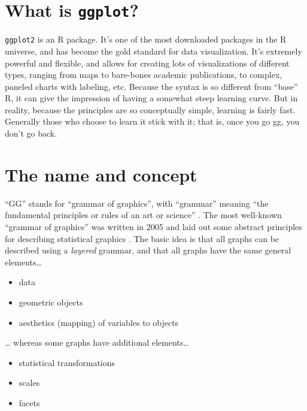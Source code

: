 \documentclass[
]{book}
\providecommand{\tightlist}{%
  \setlength{\itemsep}{0pt}\setlength{\parskip}{0pt}}
\begin{document}
\hypertarget{what-is-ggplot}{%
\section*{\texorpdfstring{What is \texttt{ggplot}?}{What is ggplot?}}\label{what-is-ggplot}}

\texttt{ggplot2} is an R package. It's one of the most downloaded packages in the R universe, and has become the gold standard for data visualization. It's extremely powerful and flexible, and allows for creating lots of visualizations of different types, ranging from maps to bare-bones academic publications, to complex, paneled charts with labeling, etc. Because the syntax is so different from ``base'' R, it can give the impression of having a somewhat steep learning curve. But in reality, because the principles are so conceptually simple, learning is fairly fast. Generally those who choose to learn it stick with it; that is, once you go gg, you don't go back.

\hypertarget{the-name-and-concept}{%
\section*{The name and concept}\label{the-name-and-concept}}

``GG'' stands for ``grammar of graphics'', with ``grammar'' meaning ``the fundamental principles or rules of an art or science'' \citep{layered-grammar}. The most well-known ``grammar of graphics'' was written in 2005 and laid out some abstract principles for describing statistical graphics \citep{10.5555/1088896}. The basic idea is that all graphs can be described using a \emph{layered} grammar, and that all graphs have the same general elements\ldots{}

\begin{itemize}
\tightlist
\item
  data
\item
  geometric objects
\item
  aesthetics (mapping) of variables to objects
\end{itemize}

\ldots{} whereas some graphs have additional elements\ldots{}

\begin{itemize}
\tightlist
\item
  statistical transformations
\item
  scales
\item
  facets
\end{itemize}
\end{document}
